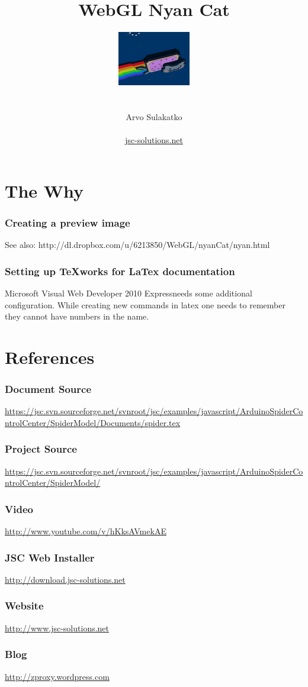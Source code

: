 \documentclass[12pt,leqno]{book}
\title{WebGL Nyan Cat}
\author{\includegraphics{../Design/Preview.png} \\ \\ \\ Arvo Sulakatko \\ \\ \href{http://www.jsc-solutions.net}{jsc-solutions.net} }
\newcommand{\webdev}{Microsoft Visual Web Developer 2010 Express}
\newcommand{\png}[1]{\texttt{[image: \#1]}}
\newcommand{\figpng}[2]{\begin{figure}[htb]\centering\png{#1}\caption{#2}\end{figure}}
\begin{document}
\maketitle



\tableofcontents
\listoffigures


\chapter{The Why}


\subsection{Creating a preview image}

See also: http://dl.dropbox.com/u/6213850/WebGL/nyanCat/nyan.html


\subsection{Setting up TeXworks for LaTex documentation}

\webdev needs some additional configuration. While creating new commands in latex one needs to remember they cannot have numbers in the name.


\chapter{References}

\subsection{Document Source}

\url{https://jsc.svn.sourceforge.net/svnroot/jsc/examples/javascript/ArduinoSpiderControlCenter/SpiderModel/Documents/spider.tex}

\subsection{Project Source}
\url{https://jsc.svn.sourceforge.net/svnroot/jsc/examples/javascript/ArduinoSpiderControlCenter/SpiderModel/}



\subsection{Video}
\url{http://www.youtube.com/v/hKksAVmekAE}

\subsection{JSC Web Installer}
\url{http://download.jsc-solutions.net}

\subsection{Website}
\url{http://www.jsc-solutions.net}

\subsection{Blog}
\url{http://zproxy.wordpress.com}
\end{document}
